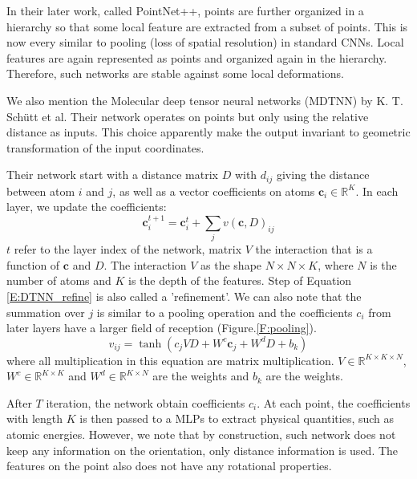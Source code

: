 \documentclass{IEEEtran}
\begin{document}
In their later work, called PointNet++\cite{qi_pointnet_2017-1}, points are further organized in a hierarchy so that some local feature are extracted from a subset of 
points. This is now every similar to pooling (loss of spatial resolution) in standard CNNs. 
Local features are again represented as points and organized again in the hierarchy. Therefore, such networks are stable against
some local deformations.

We also mention the Molecular deep tensor neural networks (MDTNN) by K. T. Sch\"{u}tt et al.\cite{schutt_quantum-chemical_2017} 
Their network operates on points but only 
using the relative distance as inputs. This choice apparently make the output invariant to geometric transformation of the input coordinates.

Their network start with a distance matrix $D$ with $d_{ij}$ giving the distance between atom $i$ and $j$, as well as a vector coefficients 
on atoms $\mathbf{c}_i \in \mathbb{R}^K$. 
In each layer, we update the coefficients:
\begin{equation}
    \mathbf{c}_i^{t+1} = \mathbf{c}_i^{t} + \sum_j v (\mathbf{c}, D) _{ij} \label{E:DTNN_refine}
\end{equation} 
$t$ refer to the layer index of the network,
matrix $V$ the interaction that is a function of $\mathbf{c}$ and $D$. The interaction $V$ as the shape $N\times N \times K$, where $N$ is
the number of atoms and $K$ is the depth of the features. Step of Equation \eqref{E:DTNN_refine} is also called a 'refinement'. 
We can also note that the summation over $j$ is similar to a pooling operation and the coefficients $c_i$ from later layers have a larger
field of reception (Figure.\ref{F:pooling}).
\begin{equation}
    v_{ij} = \tanh(c_j V D + W^c \mathbf{c}_j + W^d D + b_k )
\end{equation}
where all multiplication in this equation are matrix multiplication. 
$V\in \mathbb{R}^{K\times K \times N}$, $W^c\in \mathbb{R}^{K\times K}$ and $W^d\in \mathbb{R}^{K\times N}$ are the weights and 
$b_k$ are the weights.

After $T$ iteration, the network obtain coefficients $c_i$. At each point, the coefficients with length $K$ is then passed to 
a MLPs to extract physical quantities, such as atomic energies. However, we note that by construction, such network does not keep 
any information on the orientation, only distance information is used. The features on the point also does not have any rotational 
properties.
\end{document}
